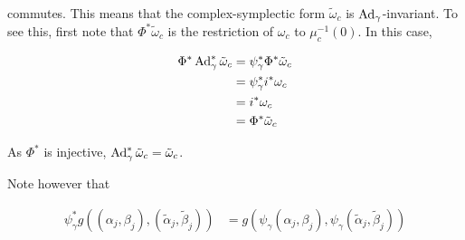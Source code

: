 \documentclass{article}
\begin{document}
commutes. This means that the complex-symplectic form \(\tilde\omega_c\) is \(\operatorname{Ad}_\gamma\)-invariant. To see this, first note that \(\Phi^*\tilde\omega_c\) is the restriction of \(\omega_c\) to \(\mu_c^{-1}(0)\). In this case,

\begin{align*}
    \Phi^*\operatorname{Ad}_\gamma^*\tilde\omega_c &= \psi_\gamma^*\Phi^*\tilde\omega_c \\
    &= \psi_\gamma^*i^*\omega_c \\
    &= i^*\omega_c \\
    &= \Phi^*\tilde\omega_c
\end{align*}

As \(\Phi^*\) is injective, \(\operatorname{Ad}_\gamma^*\tilde\omega_c = \tilde\omega_c\).

Note however that

\begin{align*}
    \psi_\gamma^*g((\alpha_j, \beta_j), (\tilde\alpha_j, \tilde\beta_j)) &= g(\psi_\gamma(\alpha_j, \beta_j), \psi_\gamma(\tilde\alpha_j, \tilde\beta_j)) \\
\end{align*}
\end{document}
